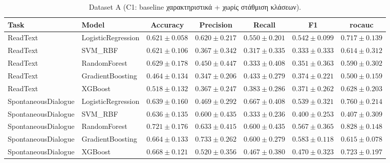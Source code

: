 \begin{table}[H]
    \centering
    \caption{Dataset A (C1: baseline χαρακτηριστικά + χωρίς στάθμιση κλάσεων).}
    \label{tab:appendix-c1-dataset-a}
    \scriptsize
    \begin{tabular}{@{}llccccc@{}}
        \toprule
        Task & Model & Accuracy & Precision & Recall & F1 & \gls{rocauc} \\
        \midrule
        ReadText & LogisticRegression & $0.621 \pm 0.058$ & $0.620 \pm 0.217$ & $0.550 \pm 0.201$ & $0.542 \pm 0.099$ & $0.717 \pm 0.139$ \\
        ReadText & SVM\_RBF & $0.621 \pm 0.106$ & $0.367 \pm 0.342$ & $0.317 \pm 0.335$ & $0.333 \pm 0.333$ & $0.614 \pm 0.312$ \\
        ReadText & RandomForest & $0.629 \pm 0.178$ & $0.450 \pm 0.447$ & $0.333 \pm 0.408$ & $0.351 \pm 0.363$ & $0.590 \pm 0.302$ \\
        ReadText & GradientBoosting & $0.464 \pm 0.134$ & $0.347 \pm 0.206$ & $0.433 \pm 0.279$ & $0.374 \pm 0.221$ & $0.500 \pm 0.159$ \\
        ReadText & XGBoost & $0.518 \pm 0.132$ & $0.367 \pm 0.247$ & $0.383 \pm 0.286$ & $0.371 \pm 0.262$ & $0.628 \pm 0.203$ \\
        \midrule
        SpontaneousDialogue & LogisticRegression & $0.639 \pm 0.160$ & $0.469 \pm 0.292$ & $0.667 \pm 0.408$ & $0.539 \pm 0.321$ & $0.760 \pm 0.214$ \\
        SpontaneousDialogue & SVM\_RBF & $0.636 \pm 0.135$ & $0.600 \pm 0.435$ & $0.333 \pm 0.236$ & $0.400 \pm 0.253$ & $0.407 \pm 0.309$ \\
        SpontaneousDialogue & RandomForest & $0.721 \pm 0.176$ & $0.633 \pm 0.415$ & $0.600 \pm 0.435$ & $0.567 \pm 0.365$ & $0.828 \pm 0.148$ \\
        SpontaneousDialogue & GradientBoosting & $0.664 \pm 0.133$ & $0.733 \pm 0.262$ & $0.600 \pm 0.279$ & $0.583 \pm 0.118$ & $0.615 \pm 0.078$ \\
        SpontaneousDialogue & XGBoost & $0.668 \pm 0.121$ & $0.520 \pm 0.356$ & $0.467 \pm 0.380$ & $0.470 \pm 0.323$ & $0.723 \pm 0.197$ \\
        \bottomrule
    \end{tabular}
\end{table}

